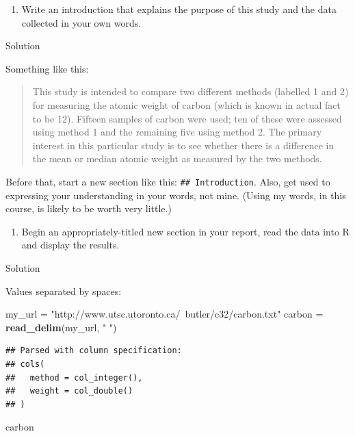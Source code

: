 \documentclass[]{tufte-book}
\newenvironment{Shaded}{}{}
\newcommand{\KeywordTok}[1]{\textcolor[rgb]{0.00,0.44,0.13}{\textbf{#1}}}
\newcommand{\NormalTok}[1]{#1}
\newcommand{\StringTok}[1]{\textcolor[rgb]{0.25,0.44,0.63}{#1}}
\providecommand{\tightlist}{%
  \setlength{\itemsep}{0pt}\setlength{\parskip}{0pt}}
\theoremstyle{definition}
\theoremstyle{definition}
\theoremstyle{definition}
\theoremstyle{remark}
\begin{document}
\begin{enumerate}
\def\labelenumi{(\alph{enumi})}
\setcounter{enumi}{1}
\tightlist
\item
  Write an introduction that explains the purpose of this study and the
  data collected in your own words.
\end{enumerate}

Solution

Something like this:

\begin{quote}
This study is intended to compare two different methods
(labelled 1 and 2) for measuring the atomic weight of carbon
(which is known in actual fact to be 12). Fifteen samples of
carbon were used; ten of these were assessed using method 1 and
the remaining five using method 2. The primary interest in this
particular study is to see whether there is a difference in the
mean or median atomic weight as measured by the two methods.
\end{quote}

Before that, start a new section like this: \texttt{\#\#\ Introduction}.
Also, get used to expressing your understanding in your words, not mine.
(Using my words, in this course, is likely to be worth very little.)

\begin{enumerate}
\def\labelenumi{(\alph{enumi})}
\setcounter{enumi}{2}
\tightlist
\item
  Begin an appropriately-titled new section in your report, read the
  data into R and display the results.
\end{enumerate}

Solution

Values separated by spaces:

\begin{Shaded}
\begin{Highlighting}[]
\NormalTok{my_url =}\StringTok{ "http://www.utsc.utoronto.ca/~butler/c32/carbon.txt"}
\NormalTok{carbon =}\StringTok{ }\KeywordTok{read_delim}\NormalTok{(my_url, }\StringTok{" "}\NormalTok{)}
\end{Highlighting}
\end{Shaded}

\begin{verbatim}
## Parsed with column specification:
## cols(
##   method = col_integer(),
##   weight = col_double()
## )
\end{verbatim}

\begin{Shaded}
\begin{Highlighting}[]
\NormalTok{carbon}
\end{Highlighting}
\end{Shaded}
\end{document}
